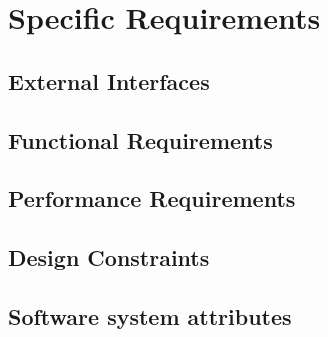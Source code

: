 \section{Specific Requirements}

\subsection{External Interfaces}


\clearpage

\subsection{Functional Requirements}


\subsection{Performance Requirements}


\subsection{Design Constraints}


\subsection{Software system attributes}

